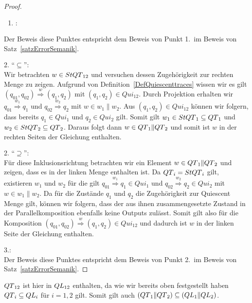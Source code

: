 \begin{proof}
  ~
  \begin{enumerate}
    \item \hspace{-0.2cm}:
  \end{enumerate}
  \vspace{-0.3cm}
  Der Beweis diese Punktes entspricht dem Beweis von Punkt 1.\ im Beweis von
  Satz~\ref{satzErrorSemanik}.

  2. ``$\subseteq$'':\\
  Wir betrachten $w\in StQT{}_{12}$ und versuchen dessen
  Zugehörigkeit zur rechten Menge zu zeigen. Aufgrund von
  Definition~\ref{DefQuiescenttraces} wissen wir es gilt $(q_{01},q_{02})
  \overset{w}{\Rightarrow} (q_1,q_2)$ mit $(q_1,q_2)\in Qui_{12}$. Durch
  Projektion erhalten wir $q_{01} \overset{w_1}{\Rightarrow} q_1$ und $q_{02}
  \overset{w_2}{\Rightarrow} q_2$ mit $w\in w_1\|w_2$. Aus $(q_1,q_2)\in
  Qui_{12}$ können wir folgern, dass bereits $q_1\in Qui_1$ und $q_2\in
  Qui_2$ gilt. Somit gilt $w_1\in StQT{}_1\subseteq QT{}_1$ und $w_2\in
  StQT{}_2\subseteq QT{}_2$. Daraus folgt dann $w\in QT{}_1\|QT{}_2$ und somit ist $w$
  in der rechten Seiten der Gleichung enthalten.

  2. ``$\supseteq$'':\\
  Für diese Inklusionsrichtung betrachten wir ein Element $w\in QT{}_1\|QT{}_2$ und
  zeigen, dass es in der linken Menge enthalten ist. Da $QT{}_i = StQT{}_i$ gilt,
  existieren $w_1$ und $w_2$ für die gilt $q_{01} \overset{w_1}{\Rightarrow}
  q_1\in Qui_1$ und $q_{02} \overset{w_2}{\Rightarrow} q_2\in Qui_2$ mit $w\in
  w_1\| w_2$. Da für die Zustände $q_1$ und $q_2$ die Zugehörigkeit zur
  Quiescent Menge gilt, können wir folgern, dass der aus ihnen zusammengesetzte
  Zustand in der Parallelkomposition ebenfalls keine Outputs zulässt. Somit
  gilt also für die Komposition $(q_{01},q_{02}) \overset{w}{\Rightarrow}
  (q_1,q_2)\in Qui_{12}$ und dadurch ist $w$ in der linken Seite der Gleichung
  enthalten.

  3.:\\
  Der Beweis diese Punktes entspricht dem Beweis von Punkt 2.\ im Beweis von
  Satz~\ref{satzErrorSemanik}.
\end{proof}

$QT{}_{12}$ ist hier in $QL{}_{12}$ enthalten, da wie wir bereits oben festgestellt
haben $QT{}_i\subseteq QL{}_i$ für $i=1,2$ gilt. Somit gilt auch
$(QT{}_1\|QT{}_2)\subseteq (QL{}_1\|QL{}_2)$.

